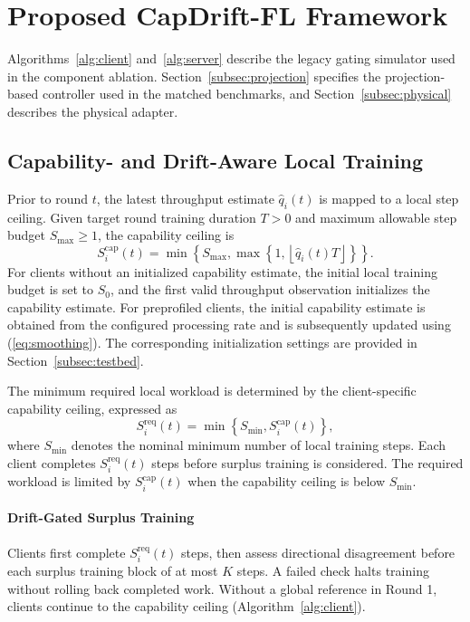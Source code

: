 \documentclass[conference]{IEEEtran}
\begin{document}
\section{Proposed CapDrift-FL Framework}
\label{sec:framework}
Algorithms~\ref{alg:client} and~\ref{alg:server} describe the legacy gating simulator used in the component ablation. Section~\ref{subsec:projection} specifies the projection-based controller used in the matched benchmarks, and Section~\ref{subsec:physical} describes the physical adapter.

\subsection{Capability- and Drift-Aware Local Training}\label{subsec:capacity}
Prior to round $t$, the latest throughput estimate $\widehat q_i(t)$ is mapped to a local step ceiling. Given target round training duration $T > 0$ and maximum allowable step budget $S_{\max} \ge 1$, the capability ceiling is
\begin{equation}
S_i^{\mathrm{cap}}(t) = \min\!\left\{S_{\max}, \max\!\left\{1, \left\lfloor\widehat q_i(t) T\right\rfloor\right\}\right\}.
\label{eq:stepcap}
\end{equation}
For clients without an initialized capability estimate, the initial local training budget is set to $S_0$, and the first valid throughput observation initializes the capability estimate. For preprofiled clients, the initial capability estimate is obtained from the configured processing rate and
is subsequently updated using (\ref{eq:smoothing}). The corresponding
initialization settings are provided
in Section~\ref{subsec:testbed}.

The minimum required local workload is
determined by the client-specific
capability ceiling, expressed as
\begin{equation}
S_i^{\mathrm{req}}(t) =
\min\!\left\{S_{\min},
S_i^{\mathrm{cap}}(t)\right\},
\label{eq:stepreq}
\end{equation}
where $S_{\min}$ denotes the nominal
minimum number of local training steps. Each client completes $S_i^{\mathrm{req}}(t)$ steps
before surplus training is considered.
The required workload is limited by
$S_i^{\mathrm{cap}}(t)$ when the
capability ceiling is below $S_{\min}$.

\paragraph{Drift-Gated Surplus Training}
Clients first complete $S_i^{\mathrm{req}}(t)$ steps, then assess directional disagreement before each surplus training block of at most $K$ steps. A failed check halts training without rolling back completed work. Without a global reference in Round 1, clients continue to the capability ceiling (Algorithm~\ref{alg:client}).
\end{document}
